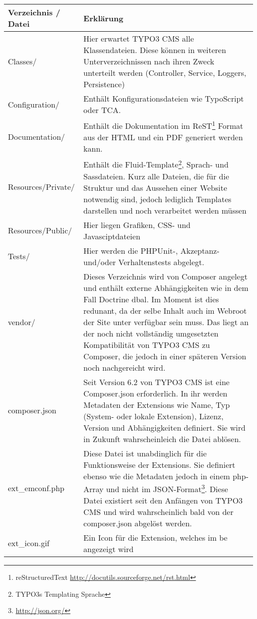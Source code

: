 \begin{longtable}{|l|p{}|}
	\hline
	Verzeichnis / Datei & Erklärung \\ \hline
	Classes/ & Hier erwartet TYPO3 CMS alle Klassendateien. Diese können in weiteren Unterverzeichnissen nach ihren Zweck unterteilt werden (Controller, Service, Loggers, Persistence)\\ \hline
	Configuration/ & Enthält Konfigurationsdateien wie TypoScript oder TCA.\\ \hline
	Documentation/ & Enthält die Dokumentation im ReST\footnote{reStructuredText \url{http://docutils.sourceforge.net/rst.html}} Format aus der HTML und ein PDF generiert werden kann.\\ \hline
	Resources/Private/ & Enthält die Fluid-Template\footnote{TYPO3s Templating Sprache}, Sprach- und Sassdateien. Kurz alle Dateien, die für die Struktur und das Aussehen einer Website notwendig sind, jedoch lediglich Templates darstellen und noch verarbeitet werden müssen\\ \hline
	Resources/Public/ & Hier liegen Grafiken, CSS- und Javasciptdateien\\ \hline
	Tests/ & Hier werden die PHPUnit-, Akzeptanz- und/oder Verhaltenstests abgelegt.\\ \hline
	vendor/ & Dieses Verzeichnis wird von Composer angelegt und enthält externe Abhängigkeiten wie in dem Fall Doctrine \gls{dbal}. Im Moment ist dies redunant, da der selbe Inhalt auch im Webroot der Site unter \pdf{Packages/Libraries/} verfügbar sein muss. Das liegt an der noch nicht vollständig umgesetzten Kompatibilität von TYPO3 CMS zu Composer, die jedoch in einer späteren Version noch nachgereicht wird.\\ \hline
	composer.json & Seit Version 6.2 von TYPO3 CMS ist eine Composer.json erforderlich. In ihr werden Metadaten der Extensions wie Name, Typ (System- oder lokale Extension), Lizenz, Version und Abhängigkeiten definiert. Sie wird in Zukunft wahrscheinleich die Datei \pdf{ext\_emconf.php} ablösen.\\  \hline
	ext\_emconf.php & Diese Datei ist unabdinglich für die Funktionsweise der Extensions. Sie definiert ebenso wie die \pdf{composer.json} Metadaten jedoch in einem \gls{php}-Array und nicht im JSON-Format\footnote{\url{http://json.org/}}. Diese Datei existiert seit den Anfängen von TYPO3 CMS und wird wahrscheinlich bald von der composer.json abgelöst werden.\\ \hline
	ext\_icon.gif & Ein Icon für die Extension, welches im \gls{be} angezeigt wird\\ \hline

\end{longtable}
